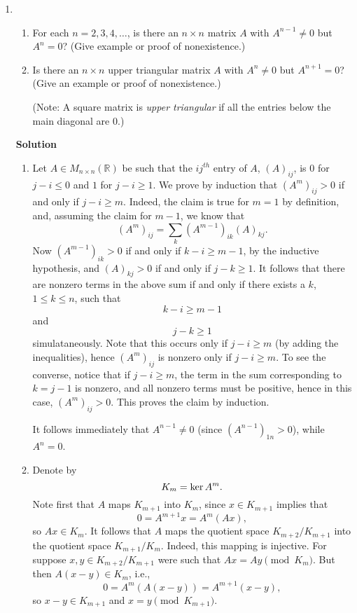 \documentclass{article}
\def\ker{\mathop{\rm ker}\nolimits}
\begin{document}
\begin{enumerate}
\begin{enumerate}
\end{enumerate}



\item

\begin{enumerate}
\item For each \(n = 2, 3, 4, \ldots\), is there an \(n \times n\) matrix \(A\) with \(A^{n - 1} \neq 0\) but \(A^n = 0\)?  (Give example or proof of nonexistence.)

\item Is there an \(n \times n\) upper triangular matrix \(A\) with \(A^n \neq 0\) but \(A^{n + 1} = 0\)?  (Give an example or proof of nonexistence.)

(Note:  A square matrix is {\em upper triangular} if all the entries below the main diagonal are \(0\).)

\end{enumerate}

{\bf Solution}

\begin{enumerate}
\item Let \(A \in M_{n \times n}(\mathbb{R})\) be such that the \(ij^{th}\) entry of \(A\), \((A)_{ij}\), is \(0\) for \(j - i \leq 0\) and \(1\) for \(j - i \geq 1\).  We prove by induction that \((A^m)_{ij} > 0\) if and only if \(j - i \geq m\).  Indeed, the claim is true for \(m = 1\) by definition, and, assuming the claim for \(m - 1\), we know that
\[(A^m)_{ij} = \sum_k (A^{m - 1})_{ik} (A)_{kj}.\]
Now \((A^{m - 1})_{ik} > 0\) if and only if \(k - i \geq m - 1\), by the inductive hypothesis, and \((A)_{kj} > 0\) if and only if \(j - k \geq 1\).  It follows that there are nonzero terms in the above sum if and only if there exists a \(k\), \(1 \leq k \leq n\), such that
\[k - i \geq m - 1\]
and
\[j - k \geq 1\]
simulataneously.  Note that this occurs only if \(j - i \geq m\) (by adding the inequalities), hence \((A^m)_{ij}\) is nonzero only if \(j - i \geq m\).  To see the converse, notice that if \(j - i \geq m\), the term in the sum corresponding to \(k = j - 1\) is nonzero, and all nonzero terms must be positive, hence in this case, \((A^m)_{ij} > 0\).  This proves the claim by induction.

It follows immediately that \(A^{n - 1} \neq 0\) (since \((A^{n - 1})_{1n} > 0\)), while \(A^n = 0\).

\item Denote by
\[K_m = \ker A^m.\]
Note first that \(A\) maps \(K_{m + 1}\) into \(K_m\), since \(x \in K_{m + 1}\) implies that
\[0 = A^{m + 1} x = A^m (Ax),\]
so \(Ax \in K_m\).  It follows that \(A\) maps the quotient space \(K_{m + 2} / K_{m + 1}\) into the quotient space \(K_{m + 1} / K_m\).  Indeed, this mapping is injective.  For suppose \(x,y \in K_{m + 2} / K_{m + 1}\) were such that \(Ax = Ay \pmod{K_m}\).  But then \(A(x - y) \in K_m\), i.e.,
\[0 = A^m(A(x - y)) = A^{m + 1}(x - y),\]
so \(x - y \in K_{m + 1}\) and \(x = y \pmod{K_{m + 1}}\).


\end{enumerate}
\end{enumerate}
\end{document}
